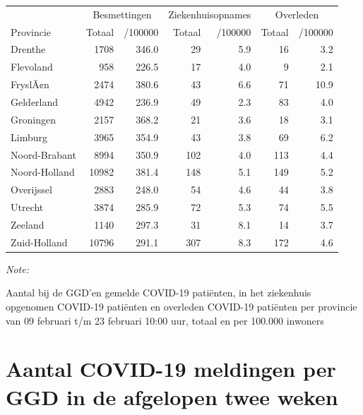 \documentclass[
  english,
  man,floatsintext]{apa6}
\begin{document}
\begin{table}[H]
\centering
\begin{threeparttable}
\begin{tabular}{lrrrrrr}
\toprule
\multicolumn{1}{c}{ } & \multicolumn{2}{c}{Besmettingen} & \multicolumn{2}{c}{Ziekenhuisopnames} & \multicolumn{2}{c}{Overleden} \\
\cmidrule(l{3pt}r{3pt}){2-3} \cmidrule(l{3pt}r{3pt}){4-5} \cmidrule(l{3pt}r{3pt}){6-7}
Provincie & Totaal & /100000 & Totaal & /100000 & Totaal & /100000\\
\midrule
Drenthe & 1708 & 346.0 & 29 & 5.9 & 16 & 3.2\\
Flevoland & 958 & 226.5 & 17 & 4.0 & 9 & 2.1\\
FryslÃ¢n & 2474 & 380.6 & 43 & 6.6 & 71 & 10.9\\
Gelderland & 4942 & 236.9 & 49 & 2.3 & 83 & 4.0\\
Groningen & 2157 & 368.2 & 21 & 3.6 & 18 & 3.1\\
Limburg & 3965 & 354.9 & 43 & 3.8 & 69 & 6.2\\
Noord-Brabant & 8994 & 350.9 & 102 & 4.0 & 113 & 4.4\\
Noord-Holland & 10982 & 381.4 & 148 & 5.1 & 149 & 5.2\\
Overijssel & 2883 & 248.0 & 54 & 4.6 & 44 & 3.8\\
Utrecht & 3874 & 285.9 & 72 & 5.3 & 74 & 5.5\\
Zeeland & 1140 & 297.3 & 31 & 8.1 & 14 & 3.7\\
Zuid-Holland & 10796 & 291.1 & 307 & 8.3 & 172 & 4.6\\
\bottomrule
\end{tabular}
\begin{tablenotes}
\item \textit{Note: } 
\item Aantal bij de GGD’en gemelde COVID-19 patiënten, in het ziekenhuis opgenomen COVID-19 patiënten en overleden COVID-19 patiënten per provincie van 09 februari t/m 23 februari 10:00 uur, totaal en per 100.000 inwoners
\end{tablenotes}
\end{threeparttable}
\end{table}

\newpage

\hypertarget{aantal-covid-19-meldingen-per-ggd-in-de-afgelopen-twee-weken}{%
\section{Aantal COVID-19 meldingen per GGD in de afgelopen twee weken}\label{aantal-covid-19-meldingen-per-ggd-in-de-afgelopen-twee-weken}}
\end{document}
